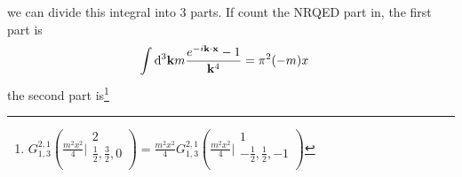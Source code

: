 \documentclass{article}
\begin{document}
we can divide this integral into 3 parts. 
If count the NRQED part in, the first part is 
\begin{align*}
  \int\dd^3\vb{k}m\frac{e^{-i\vb{k\cdot x}}-1}{\vb{k}^4}&=\pi ^2 (-m) x
\end{align*}
the second part is\footnote{$G_{1,3}^{2,1}\left(\frac{m^2 x^2}{4}|
\begin{array}{c}
 2 \\
 \frac{1}{2},\frac{3}{2},0 \\
\end{array}
\right) =\frac{m^2x^2}{4}G_{1,3}^{2,1}\left(\frac{m^2 x^2}{4}|
\begin{array}{c}
  1 \\
  -\frac{1}{2},\frac{1}{2},-1 \\
\end{array}
\right)$}
\end{document}
